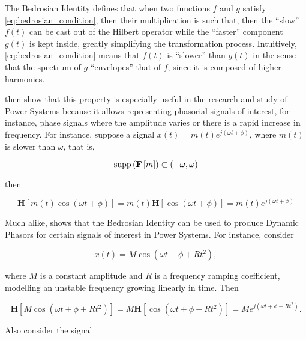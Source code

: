 	The Bedrosian Identity defines that when two functions $f$ and $g$ satisfy \eqref{eq:bedrosian_condition}, then their multiplication is such that, then the ``slow'' $f(t)$ can be cast out of the Hilbert operator while the ``faster'' component $g(t)$ is kept inside, greatly simplifying the transformation process. Intuitively, \eqref{eq:bedrosian_condition} means that $f(t)$ is ``slower'' than $g(t)$ in the sense that the spectrum of $g$ ``envelopes'' that of $f$, since it is composed of higher harmonics.

	\cite{Xu2006} then show that this property is especially useful in the research and study of Power Systems because it allows representing phasorial signals of interest, for instance, phase signals where the amplitude varies or there is a rapid increase in frequency. For instance, suppose a signal $x(t) = m(t)e^{j\left(\omega t + \phi\right)}$, where $m(t)$ is slower than $\omega$, that is,

\begin{equation} \operatorname{supp}\left(\mathbf{F}\left[m\right]\right) \subset \left(-\omega,\omega\right) \end{equation}

	\noindent then

\begin{equation} \mathbf{H}\left[m(t)\cos\left(\omega t + \phi\right)\right] = m(t) \mathbf{H}\left[\cos\left(\omega t + \phi\right)\right] = m(t)e^{j\left(\omega t + \phi\right)} \end{equation}

	Much alike, \cite{derviskadicPhasorsModelingPower2020} shows that the Bedrosian Identity can be used to produce Dynamic Phasors for certain signals of interest in Power Systems. For instance, consider

\begin{equation} x(t) = M \cos \left(\omega t + \phi + R t^2\right), \label{eq:ramping_coefficient_signal}\end{equation}

	\noindent where $M$ is a constant amplitude and $R$ is a frequency ramping coefficient, modelling an unstable frequency growing linearly in time. Then

\begin{equation} \mathbf{H}\left[M \cos\left(\omega t + \phi + Rt^2\right)\right] = M \mathbf{H}\left[\cos\left(\omega t + \phi + Rt^2\right)\right] = Me^{j\left(\omega t + \phi + Rt^2\right)} .\end{equation}

	Also consider the signal

